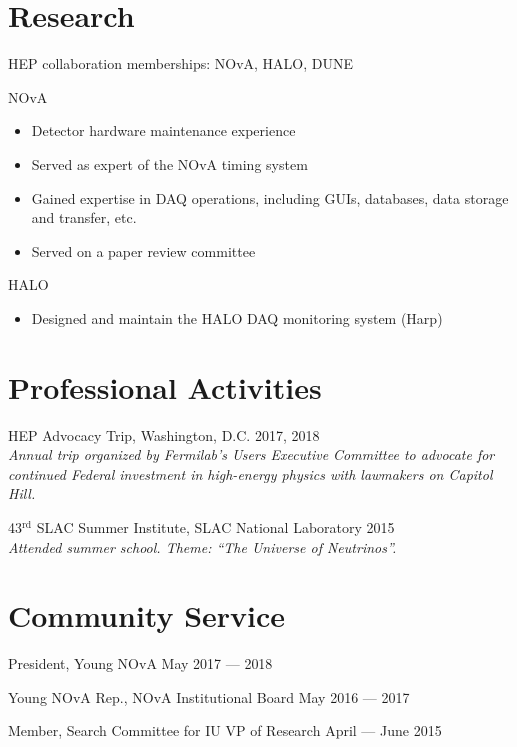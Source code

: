 \documentclass[11pt]{cv}
\begin{document}
\begin{cv}
\section{Research}

HEP collaboration memberships: NOvA, HALO, DUNE

NOvA
\begin{itemize}
  \item Detector hardware maintenance experience
  \item Served as expert of the NOvA timing system
  \item Gained expertise in DAQ operations, including GUIs, databases, data storage and transfer, etc.
  \item Served on a paper review committee
\end{itemize}

HALO
\begin{itemize}
  \item Designed and maintain the HALO DAQ monitoring system (Harp)
\end{itemize}


\section{Professional Activities}

HEP Advocacy Trip, Washington, D.C. \hfill 2017, 2018 \\
\emph{Annual trip organized by Fermilab's Users Executive Committee to advocate for continued Federal investment in high-energy physics with lawmakers on Capitol Hill.}

43$^{\text{rd}}$ SLAC Summer Institute, SLAC National Laboratory \hfill 2015 \\
\emph{Attended summer school. Theme: ``The Universe of Neutrinos''.}


\section{Community Service}

President, Young NOvA \hfill May 2017 --- 2018

Young NOvA Rep., NOvA Institutional Board \hfill May 2016 --- 2017

Member, Search Committee for IU VP of Research \hfill April --- June 2015


\end{cv}
\end{document}
